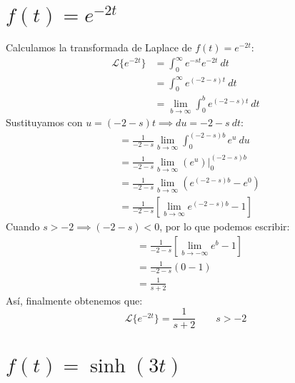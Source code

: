 \documentclass[12pt, a4paper]{article}
\begin{document}
\section{\texorpdfstring{\(f(t)=e^{-2t}\)}{f (t) = e (-2t)}}

Calculamos la transformada de Laplace de \(f(t) = e^{-2t}\):
\begin{align*}
	\mathcal{L}\{e^{-2t}\} &= \int_{0}^{\infty} e^{-st} e^{-2t}\ dt \\
	&= \int_{0}^{\infty} e^{(-2-s)t} \ dt \\
	&= \lim_{b \to \infty} \int_{0}^{b} e^{(-2-s)t} \ dt
\end{align*}
Sustituyamos con \(u = (-2-s) t \implies du = -2-s\ dt\):
\begin{align*}
	&= \frac{1}{-2-s} \lim_{b \to \infty} \int_{0}^{(-2-s)b} e^{u} \ du \\
	&= \frac{1}{-2-s} \lim_{b \to \infty} \left. \left( e^{u} \right)  \right|_{0}^{(-2-s)b} \\
	&= \frac{1}{-2-s} \lim_{b \to \infty} \left( e^{(-2-s)b} - e^{0} \right) \\
	&= \frac{1}{-2-s} \left[ \lim_{b \to \infty} e^{(-2-s)b} - 1 \right]
\end{align*}
Cuando \(s > -2 \implies (-2-s) < 0\), por lo que podemos escribir:
\begin{align*}
	&= \frac{1}{-2-s} \left[ \lim_{b \to -\infty} e^{b} - 1 \right] \\
	&= \frac{1}{-2-s} (0 - 1) \\
	&= \frac{1}{s+2}
\end{align*}
Así, finalmente obtenemos que:
\[
	\mathcal{L}\{e^{-2t}\} = \frac{1}{s+2} \qquad s > -2
\]

\setcounter{section}{13}
\section{\texorpdfstring{\(f(t)=\sinh(3t)\)}{f (t) = sinh (3t)}}
\end{document}
